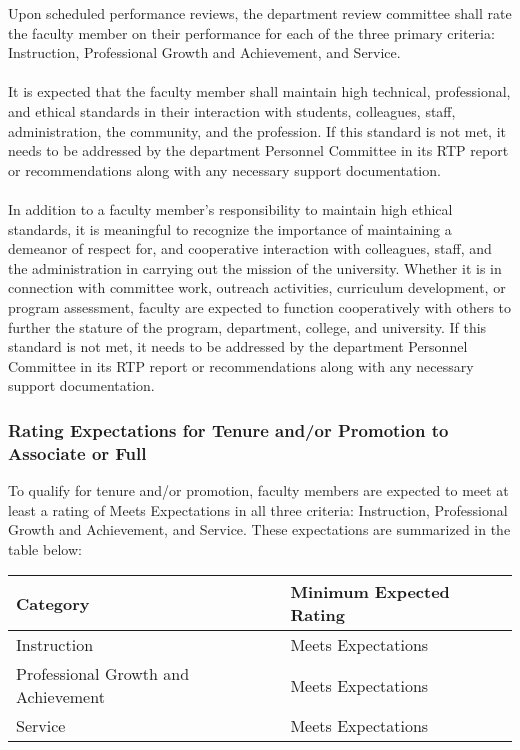 \documentclass{scrartcl}
\begin{document}
Upon scheduled performance reviews, the department review committee shall rate the faculty member on their performance for each of the three primary criteria: Instruction, Professional Growth and Achievement, and Service.
\\\\
It is expected that the faculty member shall maintain high technical, professional, and ethical standards in their interaction with students, colleagues, staff, administration, the community, and the profession. If this standard is not met, it needs to be addressed by the department Personnel Committee in its RTP report or recommendations along with any necessary support documentation.
\\\\
In addition to a faculty member’s responsibility to maintain high ethical standards, it is meaningful to recognize the importance of maintaining a demeanor of respect for, and cooperative interaction with colleagues, staff, and the administration in carrying out the mission of the university. Whether it is in connection with committee work, outreach activities, curriculum development, or program assessment, faculty are expected to function cooperatively with others to further the stature of the program, department, college, and university. If this standard is not met, it needs to be addressed by the department Personnel Committee in its RTP report or recommendations along with any necessary support documentation.

\subsubsection{Rating Expectations for Tenure and/or Promotion to Associate or Full}
To qualify for tenure and/or promotion, faculty members are expected to meet at least a rating of Meets Expectations in all three criteria: Instruction, Professional Growth and Achievement, and Service. These expectations are summarized in the table below:

\begin{longtable}{p{7cm}p{7cm}}

\hline
\textbf{Category} & \textbf{Minimum Expected Rating} \\
\hline
\endhead %
Instruction 	& Meets Expectations \\ \hline
Professional Growth and Achievement 	& Meets Expectations \\ \hline
Service 	& Meets Expectations \\ \hline
\end{longtable}
\end{document}
